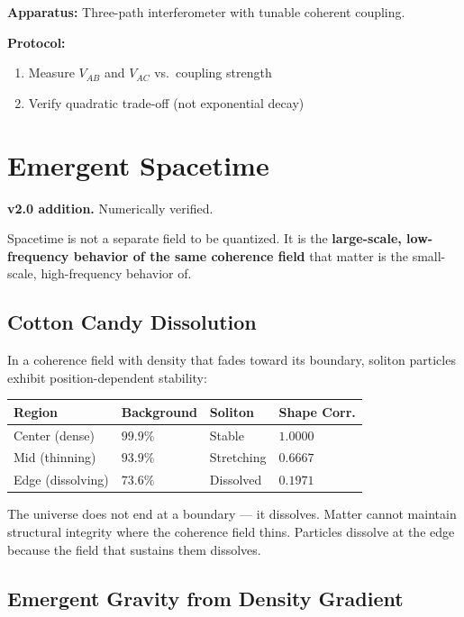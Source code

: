 \documentclass[11pt, a4paper]{article}
\begin{document}
\textbf{Apparatus:} Three-path interferometer with tunable coherent coupling.

\textbf{Protocol:}
\begin{enumerate}[nosep]
  \item Measure $V_{AB}$ and $V_{AC}$ vs.\ coupling strength
  \item Verify quadratic trade-off (not exponential decay)
\end{enumerate}

\section{Emergent Spacetime}
\label{sec:emergent-spacetime}

\textbf{v2.0 addition.} Numerically verified.

Spacetime is not a separate field to be quantized. It is the
\textbf{large-scale, low-frequency behavior of the same coherence
field} that matter is the small-scale, high-frequency behavior of.

\subsection{Cotton Candy Dissolution}

In a coherence field with density that fades toward its boundary,
soliton particles exhibit position-dependent stability:

\begin{center}
\begin{tabular}{@{}llll@{}}
\toprule
\textbf{Region} & \textbf{Background} & \textbf{Soliton} & \textbf{Shape Corr.} \\
\midrule
Center (dense)      & $99.9\%$  & Stable       & $1.0000$ \\
Mid (thinning)      & $93.9\%$  & Stretching   & $0.6667$ \\
Edge (dissolving)   & $73.6\%$  & Dissolved    & $0.1971$ \\
\bottomrule
\end{tabular}
\end{center}

The universe does not end at a boundary --- it dissolves. Matter
cannot maintain structural integrity where the coherence field thins.
Particles dissolve at the edge because the field that sustains them
dissolves.

\subsection{Emergent Gravity from Density Gradient}
\end{document}
